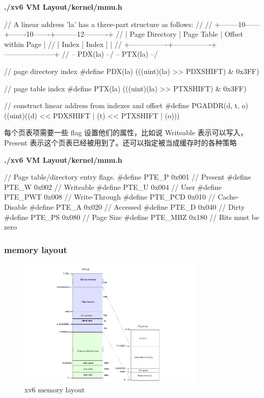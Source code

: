 \textbf{./xv6 VM Layout/kernel/mmu.h}

\begin{ccode}
// A linear address 'la' has a three-part structure as follows:
//
// +--------10------+-------10-------+---------12----------+
// | Page Directory |   Page Table   | Offset within Page  |
// |      Index     |      Index     |                     |
// +----------------+----------------+---------------------+
//  \--- PDX(la) --/ \--- PTX(la) --/

// page directory index
#define PDX(la)		(((uint)(la) >> PDXSHIFT) & 0x3FF)

// page table index
#define PTX(la)		(((uint)(la) >> PTXSHIFT) & 0x3FF)

// construct linear address from indexes and offset
#define PGADDR(d, t, o)	((uint)((d) << PDXSHIFT | (t) << PTXSHIFT | (o)))
\end{ccode}

每个页表项需要一些 flag 设置他们的属性，比如说 Writeable 表示可以写入，Present 表示这个页表已经被用到了。还可以指定被当成缓存时的各种策略

\textbf{./xv6 VM Layout/kernel/mmu.h}

\begin{ccode}
// Page table/directory entry flags.
#define PTE_P		0x001	// Present
#define PTE_W		0x002	// Writeable
#define PTE_U		0x004	// User
#define PTE_PWT		0x008	// Write-Through
#define PTE_PCD		0x010	// Cache-Disable
#define PTE_A		0x020	// Accessed
#define PTE_D		0x040	// Dirty
#define PTE_PS		0x080	// Page Size
#define PTE_MBZ		0x180	// Bits must be zero
\end{ccode}

\subsubsection{memory layout}

\begin{figure}[h]
    \centering
    \includegraphics[width=0.8\textwidth]{img/memlayout.PNG}
    \caption{xv6 memory layout}
    \label{fig:2}
\end{figure}

